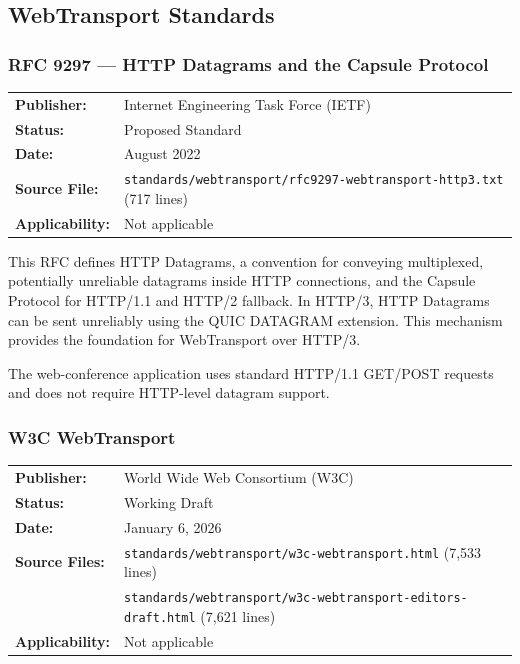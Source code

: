 \documentclass[11pt,letterpaper]{article}
\begin{document}
\subsection{WebTransport Standards}
\label{app:webtransport-standards}

\subsubsection{RFC 9297 --- HTTP Datagrams and the Capsule Protocol}
\label{app:rfc9297}

\begin{tabular}{ll}
\textbf{Publisher:} & Internet Engineering Task Force (IETF) \\
\textbf{Status:} & Proposed Standard \\
\textbf{Date:} & August 2022 \\
\textbf{Source File:} & \texttt{standards/webtransport/rfc9297-webtransport-http3.txt} (717 lines) \\
\textbf{Applicability:} & Not applicable \\
\end{tabular}

\vspace{0.5em}
This RFC defines HTTP Datagrams, a convention for conveying multiplexed, potentially unreliable datagrams inside HTTP connections, and the Capsule Protocol for HTTP/1.1 and HTTP/2 fallback. In HTTP/3, HTTP Datagrams can be sent unreliably using the QUIC DATAGRAM extension. This mechanism provides the foundation for WebTransport over HTTP/3.

The web-conference application uses standard HTTP/1.1 GET/POST requests and does not require HTTP-level datagram support.

\subsubsection{W3C WebTransport}
\label{app:w3c-webtransport}

\begin{tabular}{ll}
\textbf{Publisher:} & World Wide Web Consortium (W3C) \\
\textbf{Status:} & Working Draft \\
\textbf{Date:} & January 6, 2026 \\
\textbf{Source Files:} & \texttt{standards/webtransport/w3c-webtransport.html} (7,533 lines) \\
 & \texttt{standards/webtransport/w3c-webtransport-editors-draft.html} (7,621 lines) \\
\textbf{Applicability:} & Not applicable \\
\end{tabular}
\end{document}
